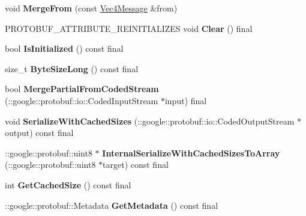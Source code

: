 \begin{DoxyCompactItemize}
\item 
\mbox{\label{classtbMath_1_1Vec4Message_a354dd27236e5f4a6702d1df8629f323f}} 
void {\bfseries Merge\+From} (const \hyperlink{classtbMath_1_1Vec4Message}{Vec4\+Message} \&from)
\item 
\mbox{\label{classtbMath_1_1Vec4Message_a2996fbe502a8a0c1708b3eee654c24d3}} 
P\+R\+O\+T\+O\+B\+U\+F\+\_\+\+A\+T\+T\+R\+I\+B\+U\+T\+E\+\_\+\+R\+E\+I\+N\+I\+T\+I\+A\+L\+I\+Z\+ES void {\bfseries Clear} () final
\item 
\mbox{\label{classtbMath_1_1Vec4Message_acab39776248ff1f45e38768ea8a6abf9}} 
bool {\bfseries Is\+Initialized} () const final
\item 
\mbox{\label{classtbMath_1_1Vec4Message_a9f11389f2aa615c566f4a5879ea2a337}} 
size\+\_\+t {\bfseries Byte\+Size\+Long} () const final
\item 
\mbox{\label{classtbMath_1_1Vec4Message_a8e34eef8196653ecad2eefdf18a71101}} 
bool {\bfseries Merge\+Partial\+From\+Coded\+Stream} (\+::google\+::protobuf\+::io\+::\+Coded\+Input\+Stream $\ast$input) final
\item 
\mbox{\label{classtbMath_1_1Vec4Message_a3b61425492484e2b3369030559b51cb6}} 
void {\bfseries Serialize\+With\+Cached\+Sizes} (\+::google\+::protobuf\+::io\+::\+Coded\+Output\+Stream $\ast$output) const final
\item 
\mbox{\label{classtbMath_1_1Vec4Message_a941be4c2f0cebd1882b9e16931cd7ba4}} 
\+::google\+::protobuf\+::uint8 $\ast$ {\bfseries Internal\+Serialize\+With\+Cached\+Sizes\+To\+Array} (\+::google\+::protobuf\+::uint8 $\ast$target) const final
\item 
\mbox{\label{classtbMath_1_1Vec4Message_a611cd6d1c64a2e16b7e06db931a504c0}} 
int {\bfseries Get\+Cached\+Size} () const final
\item 
\mbox{\label{classtbMath_1_1Vec4Message_a304c65eb2cdef3eea62b8fae64da09de}} 
\+::google\+::protobuf\+::\+Metadata {\bfseries Get\+Metadata} () const final

\end{DoxyCompactItemize}
